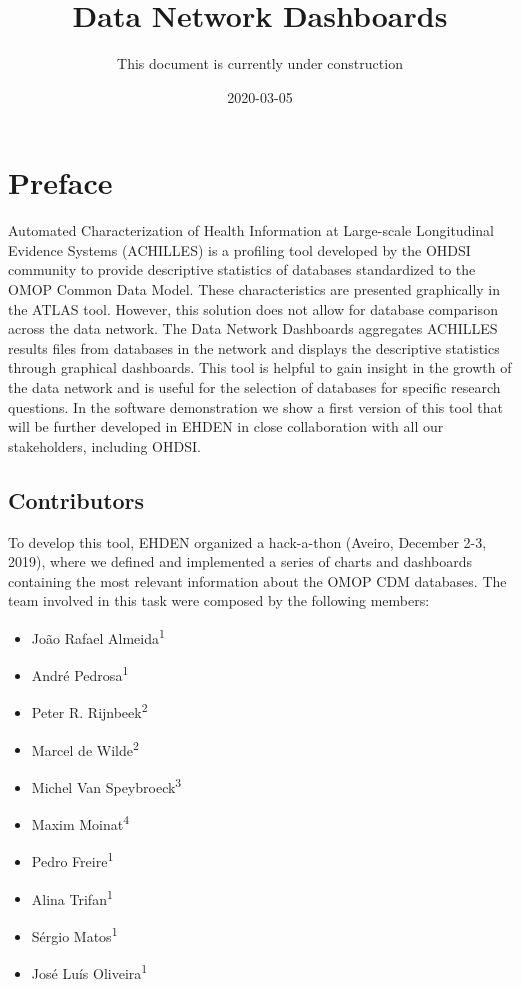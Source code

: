 \documentclass[]{book}
\title{Data Network Dashboards}
\author{This document is currently under construction}
\date{2020-03-05}
\providecommand{\tightlist}{%
  \setlength{\itemsep}{0pt}\setlength{\parskip}{0pt}}
\begin{document}
\maketitle

{
\setcounter{tocdepth}{1}
\tableofcontents
}
\chapter*{Preface}\label{preface}

Automated Characterization of Health Information at Large-scale
Longitudinal Evidence Systems (ACHILLES) is a profiling tool developed
by the OHDSI community to provide descriptive statistics of databases
standardized to the OMOP Common Data Model. These characteristics are
presented graphically in the ATLAS tool. However, this solution does not
allow for database comparison across the data network. The Data Network
Dashboards aggregates ACHILLES results files from databases in the
network and displays the descriptive statistics through graphical
dashboards. This tool is helpful to gain insight in the growth of the
data network and is useful for the selection of databases for specific
research questions. In the software demonstration we show a first
version of this tool that will be further developed in EHDEN in close
collaboration with all our stakeholders, including OHDSI.

\section*{Contributors}\label{contributors}

To develop this tool, EHDEN organized a hack-a-thon (Aveiro, December
2-3, 2019), where we defined and implemented a series of charts and
dashboards containing the most relevant information about the OMOP CDM
databases. The team involved in this task were composed by the following
members:

\begin{itemize}
\tightlist
\item
  João Rafael Almeida\textsuperscript{1}
\item
  André Pedrosa\textsuperscript{1}
\item
  Peter R. Rijnbeek\textsuperscript{2}
\item
  Marcel de Wilde\textsuperscript{2}
\item
  Michel Van Speybroeck\textsuperscript{3}
\item
  Maxim Moinat\textsuperscript{4}
\item
  Pedro Freire\textsuperscript{1}
\item
  Alina Trifan\textsuperscript{1}
\item
  Sérgio Matos\textsuperscript{1}
\item
  José Luís Oliveira\textsuperscript{1}
\end{itemize}
\end{document}
